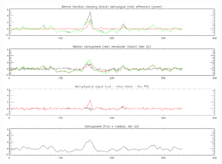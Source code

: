 \documentclass[12pt,preprint]{aastex}
\begin{document}
\addtocounter{figure}{-1}
\addtocounter{subfig}{1}

\begin{figure}
  \begin{minipage}{6.5in}
    \begin{center}
      \includegraphics[scale=0.9]{iterative_mapping3}
      \caption{}
    \end{center}
    \label{fig:IterativeMapping-c}
  \end{minipage}
\end{figure}
\end{document}
